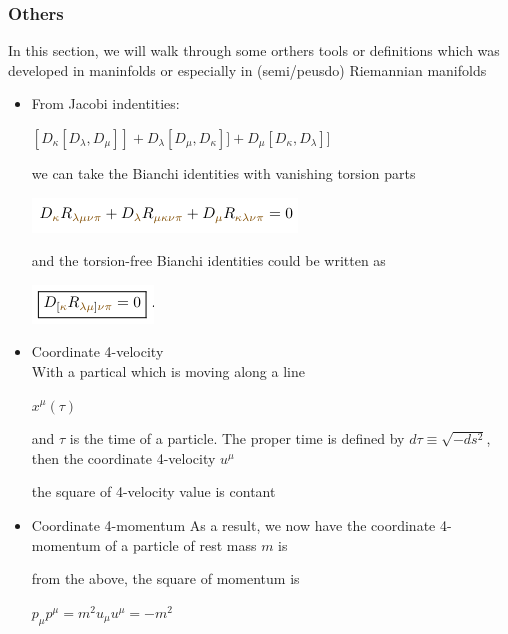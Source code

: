 \documentclass[11pt,a4paper]{article}
\begin{document}
	\subsubsection{Others}	
	In this section, we will walk through some orthers tools or definitions which was developed in maninfolds or especially in (semi/peusdo) Riemannian manifolds
	\begin{itemize}
		\item From Jacobi indentities:
		\begin{center}
			$[D_{\kappa}[D_{\lambda},D_{\mu}]] + D_{\lambda}[D_{\mu},D_{\kappa}]] + D_{\mu}[D_{\kappa},D_{\lambda}]] $
		\end{center}
		we can take the Bianchi identities with vanishing torsion parts
		\begin{center}
			\includegraphics[scale=0.5]{./bianchi_sl.png}
		\end{center}
		and the torsion-free Bianchi identities could be written as 
		\begin{center}
			\includegraphics[scale=0.5]{./tor_fre_bian.png}
		\end{center}
		\item Coordinate 4-velocity \\
		With a partical which is moving along a line 
		\begin{center}
			$x^{\mu}(\tau)$
		\end{center}
		and $\tau$  is the time of a particle. The proper time is defined  by $d \tau \equiv \sqrt{-ds^2}$, then the coordinate 4-velocity $u^{\mu}$
		\begin{center}
		\end{center}
		the square of  4-velocity value is contant
		\begin{center}
		\end{center}
		\item  Coordinate 4-momentum
		As a result, we now have the coordinate 4-momentum  of a particle  of rest mass  $\textit{m}$ is
		\begin{center}
		\end{center} 
		from the above,  the square of momentum is 
		\begin{center}
			$p_{\mu} p^{\mu} = m^2 u_{\mu} u^{\mu} = - m^2$
		\end{center}
	\end{itemize}
\end{document}
